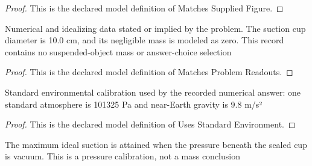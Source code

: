 \begin{proof}
  This is the declared model definition of Matches Supplied Figure.
\end{proof}
\begin{definition}
  \label{def:physics:phyx-mini-0720:phyxminiproblems-problemphyxmini0720-matchesproblemreadouts}
  Numerical and idealizing data stated or implied by the problem. The suction cup diameter is 10.0 cm, and its negligible mass is modeled as zero. This record contains no suspended-object mass or answer-choice selection
\end{definition}
\begin{proof}
  This is the declared model definition of Matches Problem Readouts.
\end{proof}
\begin{definition}
  \label{def:physics:phyx-mini-0720:phyxminiproblems-problemphyxmini0720-usesstandardenvironment}
  Standard environmental calibration used by the recorded numerical answer: one standard atmosphere is 101325 Pa and near-Earth gravity is 9.8 m/s²
\end{definition}
\begin{proof}
  This is the declared model definition of Uses Standard Environment.
\end{proof}
\begin{definition}
  \label{def:physics:phyx-mini-0720:phyxminiproblems-problemphyxmini0720-usesidealvacuumlimit}
  The maximum ideal suction is attained when the pressure beneath the sealed cup is vacuum. This is a pressure calibration, not a mass conclusion
\end{definition}
